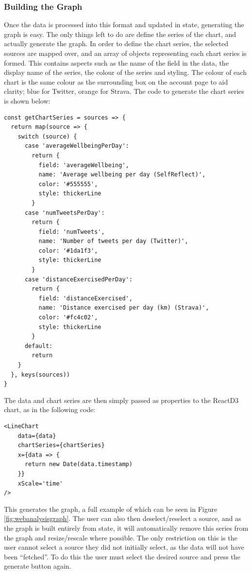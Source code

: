 \documentclass[11pt,openright,a4paper]{report}
\begin{document}
\subsubsection{Building the Graph}
Once the data is processed into this format and updated in state, generating the graph is easy. The only things left to do are define the series of the chart, and actually generate the graph. In order to define the chart series, the selected sources are mapped over, and an array of objects representing each chart series is formed. This contains aspects such as the name of the field in the data, the display name of the series, the colour of the series and styling. The colour of each chart is the same colour as the surrounding box on the account page to aid clarity; blue for Twitter, orange for Strava. The code to generate the chart series is shown below:
\begin{lstlisting}
const getChartSeries = sources => {
  return map(source => {
    switch (source) {
      case 'averageWellbeingPerDay':
        return {
          field: 'averageWellbeing',
          name: 'Average wellbeing per day (SelfReflect)',
          color: '#555555',
          style: thickerLine
        }
      case 'numTweetsPerDay':
        return {
          field: 'numTweets',
          name: 'Number of tweets per day (Twitter)',
          color: '#1da1f3',
          style: thickerLine
        }
      case 'distanceExercisedPerDay':
        return {
          field: 'distanceExercised',
          name: 'Distance exercised per day (km) (Strava)',
          color: '#fc4c02',
          style: thickerLine
        }
      default:
        return
    }
  }, keys(sources))
}
\end{lstlisting}

The data and chart series are then simply passed as properties to the ReactD3 chart, as in the following code:
\begin{lstlisting}
<LineChart
    data={data}
    chartSeries={chartSeries}
    x={data => {
      return new Date(data.timestamp)
    }}
    xScale='time'
/>
\end{lstlisting}

This generates the graph, a full example of which can be seen in Figure \ref{fig:webanalysisgraph}. The user can also then deselect/reselect a source, and as the graph is built entirely from state, it will automatically remove this series from the graph and resize/rescale where possible. The only restriction on this is the user cannot select a source they did not initially select, as the data will not have been \enquote{fetched}. To do this the user must select the desired source and press the generate button again.
\end{document}
